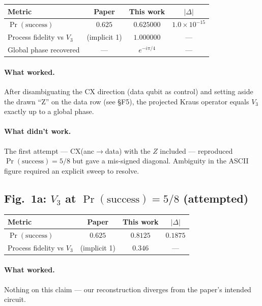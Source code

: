 \documentclass[11pt,a4paper]{article}
\newcommand{\Vthree}{V_{\!3}}
\newcommand{\Prsucc}{\Pr(\text{success})}
\begin{document}
\begin{center}
\begin{tabular}{l c c c}
\toprule
 Metric & Paper & This work & $\lvert\Delta\rvert$ \\
\midrule
 $\Prsucc$ & $0.625$ & $0.625000$ & $1.0\times 10^{-15}$ \\
 Process fidelity vs $\Vthree$ & (implicit 1) & $1.000000$ & --- \\
 Global phase recovered & --- & $e^{-i\pi/4}$ & --- \\
\bottomrule
\end{tabular}
\end{center}

\paragraph{What worked.} After disambiguating the CX direction (data qubit as
control) and setting aside the drawn ``Z'' on the data row (see \S F5), the
projected Kraus operator equals $\Vthree$ exactly up to a global phase.

\paragraph{What didn't work.} The first attempt --- CX(anc$\to$data) with the
$Z$ included --- reproduced $\Prsucc=5/8$ but gave a mis-signed diagonal.
Ambiguity in the ASCII figure required an explicit sweep to resolve.

\subsection{Fig.~1a: $\Vthree$ at $\Prsucc = 5/8$ (attempted)}

\begin{center}
\begin{tabular}{l c c c}
\toprule
 Metric & Paper & This work & $\lvert\Delta\rvert$ \\
\midrule
 $\Prsucc$ & $0.625$ & $0.8125$ & $0.1875$ \\
 Process fidelity vs $\Vthree$ & (implicit 1) & $0.346$ & --- \\
\bottomrule
\end{tabular}
\end{center}

\paragraph{What worked.} Nothing on this claim ---
our reconstruction diverges from the paper's intended circuit.
\end{document}
